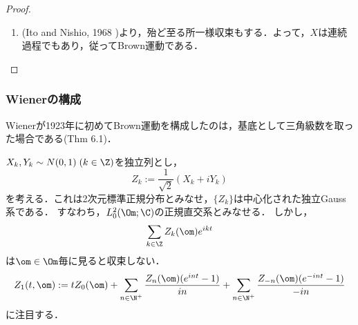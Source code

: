 \documentclass[uplatex,dvipdfmx]{jsreport}
\begin{document}
\begin{proof}
\begin{enumerate}
        \item (Ito and Nishio, 1968 \cite{Ito-Nishio})より，殆ど至る所一様収束もする．よって，$X$は連続過程でもあり，従ってBrown運動である．
    \end{enumerate}
\end{proof}

\subsubsection{Wienerの構成}

\begin{tcolorbox}[colframe=ForestGreen, colback=ForestGreen!10!white,breakable,colbacktitle=ForestGreen!40!white,coltitle=black,fonttitle=\bfseries\sffamily,
title=]
    Wienerが1923年に初めてBrown運動を構成したのは，基底として三角級数を取った場合である\cite{Bass}(Thm 6.1)．
\end{tcolorbox}

\begin{notation}
    $X_k,Y_k\sim N(0,1)\;(k\in\Z)$を独立列とし，
    \[Z_k:=\frac{1}{\sqrt{2}}(X_k+iY_k)\]
    を考える．これは2次元標準正規分布とみなせ，$\{Z_k\}$は中心化された独立Gauss系である．
    すなわち，$L^2_0(\Om;\C)$の正規直交系とみなせる．
    しかし，
    \[\sum_{k\in\Z}Z_k(\om)e^{ikt}\]
    は$\om\in\Om$毎に見ると収束しない．
    \[Z_1(t,\om):=tZ_0(\om)+\sum_{n\in\N^+}\frac{Z_n(\om)(e^{int}-1)}{in}+\sum_{n\in\N^+}\frac{Z_{-n}(\om)(e^{-int}-1)}{-in}\]
    に注目する．
\end{notation}
\end{document}
